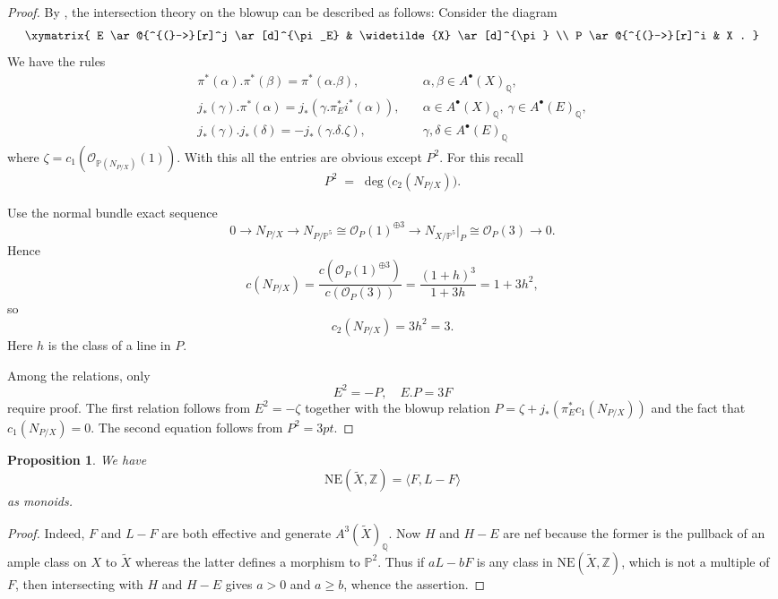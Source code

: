 \documentclass[11pt]{amsart}
\theoremstyle{plain}
\newtheorem{proposition}[theorem]{Proposition}
\numberwithin{equation}{section}
\theoremstyle{definition}
\theoremstyle{remark}
\newcommand{\Z}{\mathbb Z}
\renewcommand{\P}{\mathbb P}
\newcommand{\Q}{\mathbb Q}
\begin{document}
\begin{proof}
By \cite[Chapter 6, 6.7]{Ful98}, the intersection theory on the blowup can be described as follows: Consider the diagram
\[
\xymatrix{
E \ar@{^{(}->}[r]^j \ar[d]^{\pi_E} & \widetilde{X} \ar[d]^{\pi} \\
P \ar@{^{(}->}[r]^i & X .
}
\]
We have the rules
\begin{align*}
\pi^* (\alpha ) . \pi^* (\beta ) = \pi^* (\alpha . \beta) ,  & \quad  \alpha, \beta \in A^{\bullet}(X)_{\Q}, \\
j_* (\gamma ) . \pi^* (\alpha ) = j_* ( \gamma . \pi_E^* i^* (\alpha )) , & \quad \alpha \in A^{\bullet}(X)_{\Q}, \: \gamma \in A^{\bullet}(E)_{\Q}, \\
j_* (\gamma ) . j_* (\delta ) = - j_* (\gamma . \delta . \zeta) , & \quad \gamma , \delta \in A^{\bullet}(E)_{\Q}
\end{align*}
where $\zeta = c_1 (\mathcal{O}_{\P (N_{P/X})}(1))$. With this all the entries are obvious except $P^2$. For this recall 
\[
P^2 \;=\; \deg\bigl(c_2(N_{P/X})\bigr).
\]

Use the normal bundle exact sequence
\[
0 \longrightarrow N_{P/X} \longrightarrow N_{P/\mathbb P^5}\cong \mathcal O_P(1)^{\oplus 3}
\longrightarrow N_{X/\mathbb P^5}\big|_P \cong \mathcal O_P(3) \longrightarrow 0 .
\]
Hence
\[
c(N_{P/X})=\frac{c\!\left(\mathcal O_P(1)^{\oplus 3}\right)}{c\!\left(\mathcal O_P(3)\right)}
=\frac{(1+h)^3}{1+3h}
=1+3h^2,
\]
so
\[
c_2(N_{P/X})=3h^2 = 3.
\]
Here $h$ is the class of a line in $P$. 

\medskip

Among the relations, only 
\[
E^2  = -P , \quad 
E.P  = 3F 
\]
require proof. The first relation follows from $E^2 =-\zeta$ together with the blowup relation $P =\zeta + j_* (\pi_E^* c_1 (N_{P/X}))$ \cite[Thm. 13.14]{E-H16} and the fact that $c_1 (N_{P/X}) =0$. The second equation follows from $P^2 =3 pt$. 
\end{proof}

\begin{proposition}\label{pMonoidOfCurves}
We have
\[
\mathrm{NE}(\widetilde{X}, \Z ) = \langle F, L-F \rangle
\]
as monoids.
\end{proposition}

\begin{proof}
 Indeed, $F$ and $L-F$ are both effective and generate $A^{3}(\widetilde{X})_{\Q}$. Now $H$ and $H-E$ are nef because the former is the pullback of an ample class on $X$ to $\widetilde{X}$ whereas the latter defines a morphism to $\P^2$. Thus if $aL - bF$ is any class in $\mathrm{NE}(\widetilde{X}, \Z )$, which is not a multiple of $F$, then intersecting with $H$ and $H-E$ gives $a>0$ and $a\ge b$, whence the assertion. 
 \end{proof}
\end{document}
